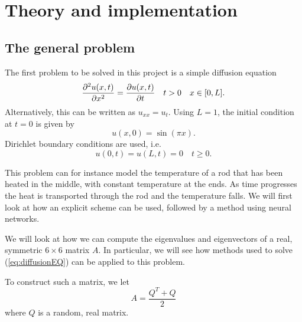 \section{Theory and implementation}
\label{sec:theory}

\subsection{The general problem}

The first problem to be solved in this project is a simple diffusion equation
\begin{equation}
\pdv[2]{u(x,t)}{x} = \pdv{u(x,t)}{t} \quad t>0 \quad x\in [0,L].
    \label{eq:diffusionEQ}
\end{equation}
Alternatively, this can be written as $u_{xx} = u_t$. Using $L=1$, the initial condition at $t=0$ is given by
\begin{equation}
    u(x,0) = \sin(\pi x)
    \label{eq:initialCondition}.
\end{equation}
Dirichlet boundary conditions are used, i.e.
\begin{equation*}
    u(0,t) = u(L,t) = 0 \quad t \geq 0.
\end{equation*}

This problem can for instance model the temperature of a rod that has been heated in the middle, with constant temperature at the ends.
As time progresses the heat is transported through the rod and the temperature falls. We will first look at how an explicit scheme can be used, followed by a method using neural networks.

We will look at how we can compute the eigenvalues and eigenvectors of a real, symmetric $6\times 6$ matrix $A$. In particular, we will see how methods used to solve (\eqref{eq:diffusionEQ}) can be applied to this problem.

To construct such a matrix, we let
\begin{equation*}
	A = \frac{Q^T+Q }{2}
\end{equation*}
where $Q$ is a random, real matrix.

